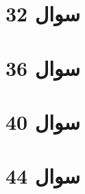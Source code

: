 \documentclass[12pt]{article}
\begin{document}
\section*{سوال 32}


\section*{سوال 36}


\section*{سوال 40}

\section*{سوال 44}

 
\end{document}

